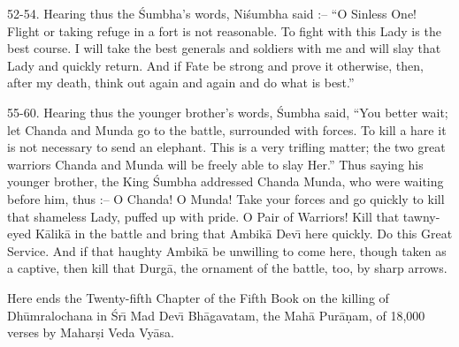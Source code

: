 52-54. Hearing thus the \'Sumbha's words, Ni\'sumbha said :-- ``O Sinless One! Flight or taking refuge in a fort is not reasonable. To fight with this Lady is the best course. I will take the best generals and soldiers with me and will slay that Lady and quickly return. And if Fate be strong and prove it otherwise, then, after my death, think out again and again and do what is best.''

55-60. Hearing thus the younger brother's words, \'Sumbha said, ``You better wait; let Chanda and Munda go to the battle, surrounded with forces. To kill a hare it is not necessary to send an elephant. This is a very trifling matter; the two great warriors Chanda and Munda will be freely able to slay Her.'' Thus saying his younger brother, the King \'Sumbha addressed Chanda Munda, who were waiting before him, thus :-- O Chanda! O Munda! Take your forces and go quickly to kill that shameless Lady, puffed up with pride. O Pair of Warriors! Kill that tawny-eyed K\=alik\=a in the battle and bring that Ambik\=a Dev\={\i} here quickly. Do this Great Service. And if that haughty Ambik\=a be unwilling to come here, though taken as a captive, then kill that Durg\=a, the ornament of the battle, too, by sharp arrows.

Here ends the Twenty-fifth Chapter of the Fifth Book on the killing of Dh\=umralochana in \'Sr\={\i} Mad Dev\={\i} Bh\=agavatam, the Mah\=a Pur\=a\d{n}am, of 18,000 verses by Mahar\d{s}i Veda Vy\=asa.



